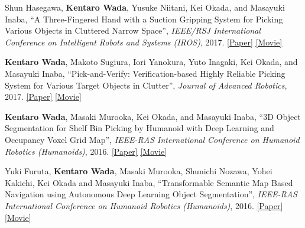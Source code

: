 \documentclass[letterpaper,MMMyyyy,nonstop]{simpleresumecv}
\begin{document}
\begin{body}
\BigGapNoBreak

Shun Hasegawa, \textbf{Kentaro Wada}, Yusuke Niitani, Kei Okada, and Masayuki Inaba,
``A Three-Fingered Hand with a Suction Gripping System for Picking Various Objects in Cluttered Narrow Space'',
\textit{IEEE/RSJ International Conference on Intelligent Robots and Systems (IROS)}, 2017.
\href{https://drive.google.com/open?id=1JK_o178iRMlQUQQgIlBLlltsj7cwMDeE}{\underline{[Paper]}}
\href{https://drive.google.com/open?id=1JPzAq4B47cjH35bhAjGRFMXyUN7voO4o}{\underline{[Movie]}}

\BigGapNoBreak

\textbf{Kentaro Wada}, Makoto Sugiura, Iori Yanokura, Yuto Inagaki, Kei Okada, and Masayuki Inaba,
``Pick-and-Verify: Verification-based Highly Reliable Picking System for Various Target Objects in Clutter'',
\textit{Journal of Advanced Robotics}, 2017.
\href{http://www.tandfonline.com/doi/abs/10.1080/01691864.2016.1269672?journalCode=tadr20}{\underline{[Paper]}}
\href{http://www.tandfonline.com/doi/suppl/10.1080/01691864.2016.1269672?scroll=top}{\underline{[Movie]}}

\BigGapNoBreak

\textbf{Kentaro Wada}, Masaki Murooka, Kei Okada, and Masayuki Inaba,
``3D Object Segmentation for Shelf Bin Picking by Humanoid with Deep Learning and Occupancy Voxel Grid Map'',
\textit{IEEE-RAS International Conference on Humanoid Robotics (Humanoids)}, 2016.
\href{http://ieeexplore.ieee.org/document/7803415/}{\underline{[Paper]}}
\href{https://drive.google.com/open?id=19YwO1LXAcRCfS8rAM5paxc2SEzGE3odA}{\underline{[Movie]}}

\BigGapNoBreak

Yuki Furuta, \textbf{Kentaro Wada}, Masaki Murooka, Shunichi Nozawa, Yohei Kakichi, Kei Okada and Masayuki Inaba,
``Transformable Semantic Map Based Navigation using Autonomous Deep Learning Object Segmentation'',
\textit{IEEE-RAS International Conference on Humanoid Robotics (Humanoids)}, 2016.
\href{http://ieeexplore.ieee.org/document/7803338/}{\underline{[Paper]}}
\href{https://drive.google.com/open?id=1ljJQ4SUjkNT1S1GWb4h7h__zbStz3oOo}{\underline{[Movie]}}


\end{body}
\end{document}
